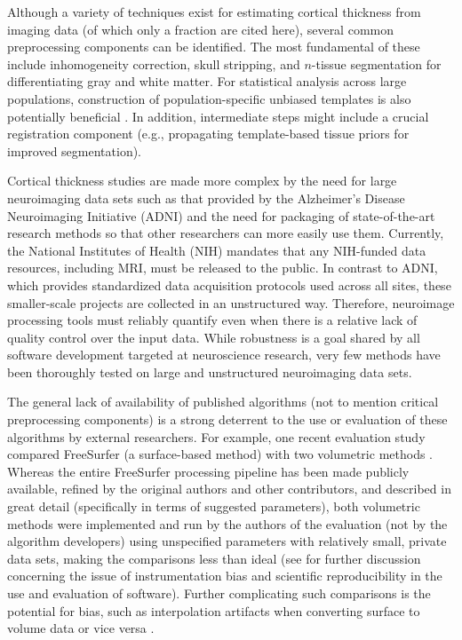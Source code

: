 Although a variety of techniques exist for estimating cortical thickness
from imaging data (of which only a fraction are cited here), several common preprocessing components
can be identified.  The most fundamental of these include inhomogeneity correction, skull stripping, and $n$-tissue segmentation for differentiating gray and white matter.  For statistical analysis
across large populations, construction of population-specific unbiased templates
is also potentially beneficial \citep{evans2012}.
In addition, intermediate steps might include a crucial registration component (e.g.,
propagating template-based tissue priors for improved segmentation).

Cortical thickness studies are made more complex by
the need for large neuroimaging data sets such as that provided by the Alzheimer's
Disease Neuroimaging Initiative (ADNI) \citep{Weiner2012}
and the need for packaging of 
state-of-the-art research methods so that other researchers can more easily use them.  
Currently, the National Institutes of Health (NIH) mandates that any NIH-funded data
resources, including MRI, must be released to the public.  In contrast
to ADNI, which provides standardized data acquisition protocols used
across all sites, these smaller-scale projects are collected in an
unstructured way.  Therefore, neuroimage processing tools must
reliably quantify even when there is a relative lack of quality
control over the input data.  While robustness is a goal shared by all
software development targeted at neuroscience research, very few methods have
been thoroughly tested on large and unstructured neuroimaging data sets.


The general lack of availability of published
algorithms \citep{kovacevic2006} (not to mention critical preprocessing
components) is a strong deterrent to the use or evaluation of these algorithms
by external researchers.  For example, one recent evaluation
study \citep{clarkson2011} compared
FreeSurfer (a surface-based method) with two volumetric methods \citep{jones2000,das2009}.
Whereas the entire FreeSurfer processing pipeline has been made publicly available, 
refined by the original authors and other contributors, and described in great detail 
(specifically in terms of suggested parameters), both volumetric methods were
implemented and run by the authors of the evaluation (not by the algorithm developers)
using unspecified parameters with relatively small, private data sets,
making the comparisons less than ideal (see \cite{tustison2013} for further discussion
concerning the issue of instrumentation bias and scientific reproducibility in the use and evaluation of software).
Further complicating such comparisons is the potential for bias, such as interpolation artifacts when
converting surface to volume data or vice versa \citep{klein2010}.

